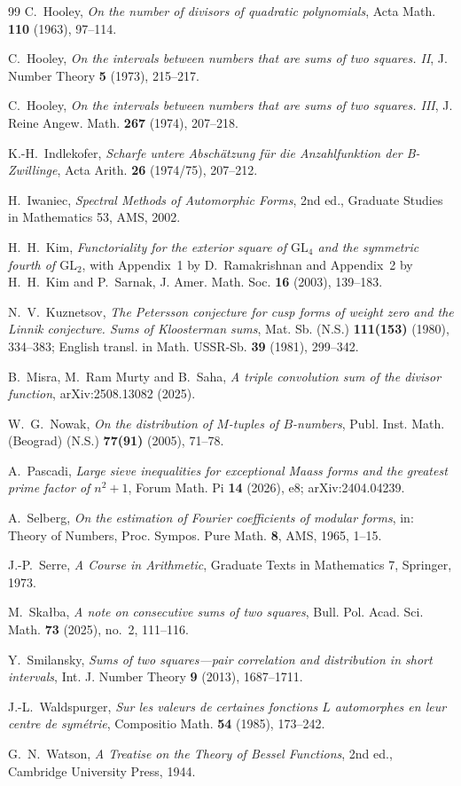 \documentclass[11pt]{amsart}
\theoremstyle{remark}
\theoremstyle{definition}
\numberwithin{equation}{section}
\begin{document}
\begin{thebibliography}{99}
 C.~Hooley, \emph{On the number of divisors of quadratic polynomials}, Acta Math. \textbf{110} (1963), 97--114.

 C.~Hooley, \emph{On the intervals between numbers that are sums of two squares. II}, J. Number Theory \textbf{5} (1973), 215--217.

 C.~Hooley, \emph{On the intervals between numbers that are sums of two squares. III}, J. Reine Angew. Math. \textbf{267} (1974), 207--218.

 K.-H.~Indlekofer, \emph{Scharfe untere Absch\"atzung f\"ur die Anzahlfunktion der B-Zwillinge}, Acta Arith. \textbf{26} (1974/75), 207--212.

 H.~Iwaniec, \emph{Spectral Methods of Automorphic Forms}, 2nd ed., Graduate Studies in Mathematics 53, AMS, 2002.

 H.~H.~Kim, \emph{Functoriality for the exterior square of $\mathrm{GL}_4$ and the symmetric fourth of $\mathrm{GL}_2$}, with Appendix~1 by D.~Ramakrishnan and Appendix~2 by H.~H.~Kim and P.~Sarnak, J. Amer. Math. Soc. \textbf{16} (2003), 139--183.

 N.~V.~Kuznetsov, \emph{The Petersson conjecture for cusp forms of weight zero and the Linnik conjecture. Sums of Kloosterman sums}, Mat. Sb. (N.S.) \textbf{111(153)} (1980), 334--383; English transl. in Math. USSR-Sb. \textbf{39} (1981), 299--342.

 B.~Misra, M.~Ram Murty and B.~Saha, \emph{A triple convolution sum of the divisor function}, arXiv:2508.13082 (2025).

 W.~G.~Nowak, \emph{On the distribution of $M$-tuples of $B$-numbers}, Publ. Inst. Math. (Beograd) (N.S.) \textbf{77(91)} (2005), 71--78.

 A.~Pascadi, \emph{Large sieve inequalities for exceptional Maass forms and the greatest prime factor of $n^2+1$}, Forum Math. Pi \textbf{14} (2026), e8; arXiv:2404.04239.

 A.~Selberg, \emph{On the estimation of Fourier coefficients of modular forms}, in: Theory of Numbers, Proc. Sympos. Pure Math. \textbf{8}, AMS, 1965, 1--15.

 J.-P.~Serre, \emph{A Course in Arithmetic}, Graduate Texts in Mathematics 7, Springer, 1973.

 M.~Ska{\l}ba, \emph{A note on consecutive sums of two squares}, Bull. Pol. Acad. Sci. Math. \textbf{73} (2025), no.~2, 111--116.

 Y.~Smilansky, \emph{Sums of two squares---pair correlation and distribution in short intervals}, Int. J. Number Theory \textbf{9} (2013), 1687--1711.

 J.-L.~Waldspurger, \emph{Sur les valeurs de certaines fonctions $L$ automorphes en leur centre de sym\'etrie}, Compositio Math. \textbf{54} (1985), 173--242.

 G.~N.~Watson, \emph{A Treatise on the Theory of Bessel Functions}, 2nd ed., Cambridge University Press, 1944.

\end{thebibliography}
\end{document}

